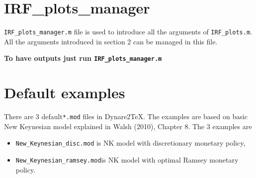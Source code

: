 \documentclass[11pt,a4paper]{article}
\begin{document}
\section{IRF\_plots\_manager}
\texttt{IRF\_plots\_manager.m} file is used to introduce all the arguments of \texttt{IRF_plots.m}. All the arguments introduced in section 2 can be managed in this file. 

{\bf To have outputs just run \texttt{IRF\_plots\_manager.m}} 

\section{Default examples}
There are 3 default\texttt{*.mod} files in Dynare2TeX. The examples are based on basic New Keynesian model explained in Walsh (2010), Chapter 8. The 3 examples are
\begin{itemize}
\item \texttt{New_Keynesian_disc.mod} is NK model  with discretionary monetary policy,
\item \texttt{New_Keynesian_ramsey.mod}is NK model with optimal Ramsey monetary policy.
\end{itemize}
\end{document}
